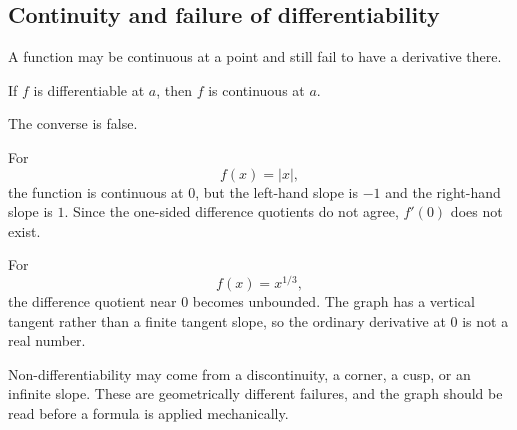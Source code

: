 \subsection{Continuity and failure of differentiability}

A function may be continuous at a point and still fail to have a derivative there.

\begin{theorembox}
If \(f\) is differentiable at \(a\), then \(f\) is continuous at \(a\).
\end{theorembox}

The converse is false.

\begin{examplebox}[A corner]
For
\[
f(x)=|x|,
\]
the function is continuous at \(0\), but the left-hand slope is \(-1\) and the right-hand slope is \(1\). Since the one-sided difference quotients do not agree, \(f'(0)\) does not exist.
\end{examplebox}

\begin{examplebox}
For
\[
f(x)=x^{1/3},
\]
the difference quotient near \(0\) becomes unbounded. The graph has a vertical tangent rather than a finite tangent slope, so the ordinary derivative at \(0\) is not a real number.
\end{examplebox}

\begin{interpretationbox}
Non-differentiability may come from a discontinuity, a corner, a cusp, or an infinite slope. These are geometrically different failures, and the graph should be read before a formula is applied mechanically.
\end{interpretationbox}
